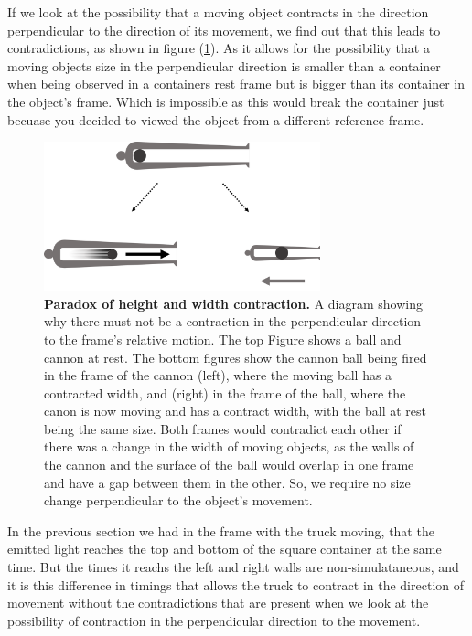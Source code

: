 If we look at the possibility that a moving object contracts in the direction perpendicular to the direction of its movement, we find out that this leads to contradictions, as shown in figure (\ref{fig: width contraction}).
As it allows for the possibility that a moving objects size in the perpendicular direction is smaller than a container when being observed in a containers rest frame but is bigger than its container in the object's frame.
Which is impossible as this would break the container just becuase you decided to viewed the object from a different reference frame.

\begin{figure}[H]
	\centering
	\includegraphics[width = 8cm]{images/pdf/Cannon_Balls.pdf}
	\caption{\textbf{Paradox of height and width contraction.} A diagram showing why there must not be a contraction in the perpendicular direction to the frame's relative motion. The top Figure shows a ball and cannon at rest. The bottom figures show the cannon ball being fired in the frame of the cannon (left), where the moving ball has a contracted width, and (right) in the frame of the ball, where the canon is now moving and has a contract width, with the ball at rest being the same size. Both frames would contradict each other if there was a change in the width of moving objects, as the walls of the cannon and the surface of the ball would overlap in one frame and have a gap between them in the other. So, we require no size change perpendicular to the object's movement.}
	\label{fig: width contraction}
\end{figure}

In the previous section we had in the frame with the truck moving, that the emitted light reaches the top and bottom of the square container at the same time.
But the times it reachs the left and right walls are non-simulataneous, and it is this difference in timings that allows the truck to contract in the direction of movement without the contradictions that are present when we look at the possibility of contraction in the perpendicular direction to the movement.


